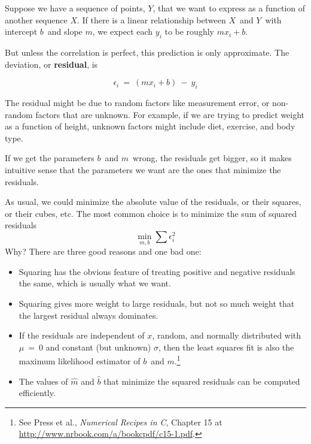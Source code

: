 Suppose we have a sequence of points, $Y$, that we want to express as a
function of another sequence $X$.  If there is a linear relationship
between $X$~and $Y$~with intercept $b$~and slope $m$, we
expect each $y_{i}$ to be roughly $m x_i + b$.

But unless the correlation is perfect, this prediction is only
approximate.  The deviation, or \textbf{residual}, is 

\[ \epsilon_{i}~=~(m x_{i}+b)~-~y_{i} \]

The residual might be due to random factors like measurement error,
or non-random factors that are unknown.  For example, if we are
trying to predict weight as a function of height, unknown factors
might include diet, exercise, and body type.

If we get the parameters $b$~and $m$~wrong, the residuals
get bigger, so it makes intuitive sense that the parameters we want
are the ones that minimize the residuals.

As usual, we could minimize the absolute value of the
residuals, or their squares, or their cubes, etc.  The most common
choice is to minimize the sum of squared residuals
%
\[ \min_{m,b} \sum \epsilon_i^2 \]
%
Why?  There are three good reasons and one bad one:

\begin{itemize}

\item Squaring has the obvious feature of treating positive and
negative residuals the same, which is usually what we want.

\item Squaring gives more weight to large residuals, but not
so much weight that the largest residual always dominates.

\item If the residuals are independent of $x$, random, and normally
  distributed with $\mu~=~0$ and constant (but unknown) $\sigma$, then
  the least squares fit is also the maximum likelihood estimator of
  $b$~and $m$.\footnote{See Press et al., {\em Numerical Recipes in C},
    Chapter 15 at \url{http://www.nrbook.com/a/bookcpdf/c15-1.pdf}.}

\item The values of $\hat{m}$ and $\hat{b}$ that minimize
  the squared residuals can be computed efficiently.

\end{itemize}

